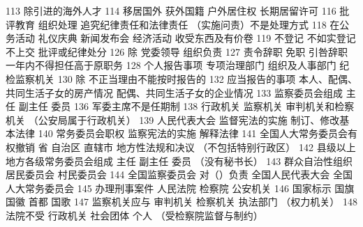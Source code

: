 \documentclass[cyan]{elegantnote}
\begin{document}
113 除引进的海外人才
114 移居国外
获外国籍 户外居住权 长期居留许可
116 批评教育 组织处理 追究纪律责任和法律责任
（实施问责）不是处理方式
118 在公务活动
礼仪庆典 新闻发布会 经济活动 收受东西及有价卷
119 不登记 不如实登记 不上交 批评或纪律处分
126 除 党委领导 组织负责
127 责令辞职 免职 引咎辞职 一年内不得担任高于原职务
128 个人报告事项 专项治理部门
组织及人事部门 纪检监察机关
130 除 不正当理由不能按时报告的
132 应当报告的事项
本人、配偶、共同生活子女的房产情况
配偶、共同生活子女的企业情况
133 监察委员会组成
主任 副主任 委员
136 军委主席不是任期制
138 行政机关 监察机关 审判机关和检察机关
（公安局属于行政机关）
139 人民代表大会
监督宪法的实施
制订、修改基本法律
140 常务委员会职权
监察宪法的实施
解释法律
141 全国人大常务委员会有权撤销
省 自治区 直辖市 地方性法规和决议
（不包括特别行政区）
142 县级以上地方各级常务委员会组成
主任
副主任
委员
（没有秘书长）
143 群众自治性组织
居民委员会
村民委员会
144 全国监察委员会 对（）负责
全国人民代表大会
全国人大常务委员会
145 办理刑事案件
人民法院 检察院 公安机关
146 国家标示
国旗 国徽 首都 国歌
147 监察机关应与
审判机关
检察机关
执法部门
（权力机关）
148 法院不受
行政机关
社会团体
个人
（受检察院监督与制约）
\end{document}
